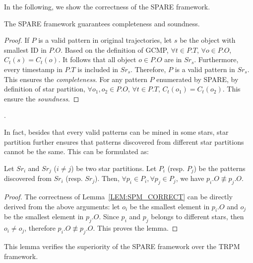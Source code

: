 In the following, we show the correctness of the SPARE framework.
\begin{theorem}
\label{THM:SPM_CORRECT}
The SPARE framework guarantees completeness and soundness.
\end{theorem}
\begin{proof}
If $P$ is a valid pattern in original trajectories, 
let $s$ be the object with smallest ID in $P.O$. 
Based on the definition of GCMP, $\forall t \in P.T$, $\forall o \in P.O$, $C_t(s) = C_t(o)$.
It follows that all object $o \in P.O$ are in $Sr_s$. 
Furthermore, every timestamp in $P.T$ is included
in $Sr_s$. Therefore, $P$ is a valid pattern in $Sr_s$. This ensures the \emph{completeness}. For any pattern $P$ enumerated by SPARE, by definition of star partition, $\forall o_1, o_2 \in P.O$, $\forall t \in P.T$, $C_t(o_1) = C_t(o_2)$. This ensure the \emph{soundness}.
\end{proof}.

In fact, besides that every valid patterns can be
mined in some stars, star partition further ensures
that patterns discovered
from different star partitions cannot be the same. 
This can be formulated as:

\begin{lemma}
\label{LEM:SPM_CORRECT}
Let $Sr_i$ and $Sr_j$ ($i\neq j$) be two star partitions. Let $P_i$ (resp. $P_j$) be 
the patterns discovered from $Sr_i$ (resp. $Sr_j$). 
Then, $\forall p_i \in P_i, \forall p_j \in P_j$, we have $p_i.O \not\equiv p_j.O$.
\end{lemma}
\begin{proof}
The correctness of Lemma~\ref{LEM:SPM_CORRECT} can be directly derived from the above arguments:
let $o_i$ be the smallest element in $p_i.O$ and $o_j$ be the smallest element in $p_j.O$. 
Since $p_i$ and $p_j$ belongs to different stars, then $o_i \neq o_j$, 
therefore $p_i.O \not\equiv p_j.O$. This proves the lemma.
\end{proof}

This lemma verifies the superiority of the SPARE framework over the TRPM framework.

